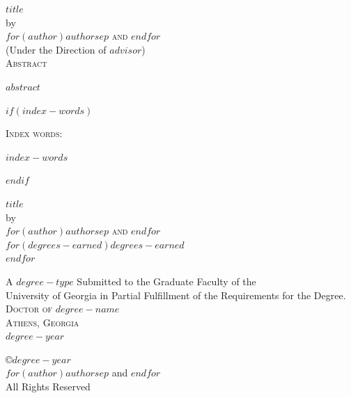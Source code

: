 \documentclass[12pt, notitlepage, twoside]{report}
\newcommand{\doctitle}{$title$}
\newcommand{\docauthor}{$for(author)$$author$$sep$ and $endfor$}
\begin{document}
\newpage
\thispagestyle{empty}
\vspace*{18pt}
\begin{center}
  \textsc{\Large{\doctitle}}\\[18pt]
  by\\[18pt]
  \textsc{\Large\docauthor}\\[12pt]
  (Under the Direction of $advisor$)\\[12pt]
  \textsc{Abstract}
\end{center}

$abstract$

\thispagestyle{empty}
$if(index-words)$
\begin{list}{\textsc{Index words:\hfill}}{\leftmargin 1.4in}
  \item \begin{flushleft}
    $index-words$
  \end{flushleft}
\end{list}
$endif$

\newpage
{}
\thispagestyle{empty}
\vspace*{18pt}
\begin{center}
  \textsc{\doctitle}\\[18pt]
  by\\[12pt]
  \textsc{\docauthor}\\[8pt]
  $for(degrees-earned)$$degrees-earned$ \\
  $endfor$

  \vfill
  A $degree-type$ Submitted to the Graduate Faculty of the\\
  University of Georgia in Partial Fulfillment of the Requirements for the Degree.\\ [18pt]

  \textsc{Doctor of $degree-name$}\\[24pt]
  \textsc{Athens, Georgia}\\[18pt]
  $degree-year$
\end{center}

\newpage
\thispagestyle{empty}
\vspace*{6.6in}
\begin{center}
  \copyright $degree-year$\\
  \docauthor\\
  All Rights Reserved
\end{center}
\end{document}
